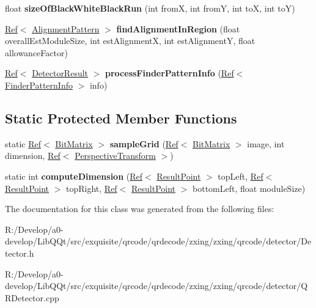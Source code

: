 \begin{DoxyCompactItemize}
float {\bfseries size\+Of\+Black\+White\+Black\+Run} (int fromX, int fromY, int toX, int toY)
\item 
\mbox{\label{classzxing_1_1qrcode_1_1_detector_a0f00f5f60df9c75daf11b7c4296a6362}} 
\mbox{\hyperlink{classzxing_1_1_ref}{Ref}}$<$ \mbox{\hyperlink{classzxing_1_1qrcode_1_1_alignment_pattern}{Alignment\+Pattern}} $>$ {\bfseries find\+Alignment\+In\+Region} (float overall\+Est\+Module\+Size, int est\+AlignmentX, int est\+AlignmentY, float allowance\+Factor)
\item 
\mbox{\label{classzxing_1_1qrcode_1_1_detector_a7b0fd56d80df3459a610d07d4dbf9f5c}} 
\mbox{\hyperlink{classzxing_1_1_ref}{Ref}}$<$ \mbox{\hyperlink{classzxing_1_1_detector_result}{Detector\+Result}} $>$ {\bfseries process\+Finder\+Pattern\+Info} (\mbox{\hyperlink{classzxing_1_1_ref}{Ref}}$<$ \mbox{\hyperlink{classzxing_1_1qrcode_1_1_finder_pattern_info}{Finder\+Pattern\+Info}} $>$ info)
\end{DoxyCompactItemize}
\subsection*{Static Protected Member Functions}
\begin{DoxyCompactItemize}
\item 
\mbox{\label{classzxing_1_1qrcode_1_1_detector_ac25b2e5e7ede70334abd739caa0fe43e}} 
static \mbox{\hyperlink{classzxing_1_1_ref}{Ref}}$<$ \mbox{\hyperlink{classzxing_1_1_bit_matrix}{Bit\+Matrix}} $>$ {\bfseries sample\+Grid} (\mbox{\hyperlink{classzxing_1_1_ref}{Ref}}$<$ \mbox{\hyperlink{classzxing_1_1_bit_matrix}{Bit\+Matrix}} $>$ image, int dimension, \mbox{\hyperlink{classzxing_1_1_ref}{Ref}}$<$ \mbox{\hyperlink{classzxing_1_1_perspective_transform}{Perspective\+Transform}} $>$)
\item 
\mbox{\label{classzxing_1_1qrcode_1_1_detector_aa7cf441702fd4ba1cd0c6b0fc0bda30e}} 
static int {\bfseries compute\+Dimension} (\mbox{\hyperlink{classzxing_1_1_ref}{Ref}}$<$ \mbox{\hyperlink{classzxing_1_1_result_point}{Result\+Point}} $>$ top\+Left, \mbox{\hyperlink{classzxing_1_1_ref}{Ref}}$<$ \mbox{\hyperlink{classzxing_1_1_result_point}{Result\+Point}} $>$ top\+Right, \mbox{\hyperlink{classzxing_1_1_ref}{Ref}}$<$ \mbox{\hyperlink{classzxing_1_1_result_point}{Result\+Point}} $>$ bottom\+Left, float module\+Size)
\end{DoxyCompactItemize}


The documentation for this class was generated from the following files\+:\begin{DoxyCompactItemize}
\item 
R\+:/\+Develop/a0-\/develop/\+Lib\+Q\+Qt/src/exquisite/qrcode/qrdecode/zxing/zxing/qrcode/detector/Detector.\+h\item 
R\+:/\+Develop/a0-\/develop/\+Lib\+Q\+Qt/src/exquisite/qrcode/qrdecode/zxing/zxing/qrcode/detector/Q\+R\+Detector.\+cpp\end{DoxyCompactItemize}
